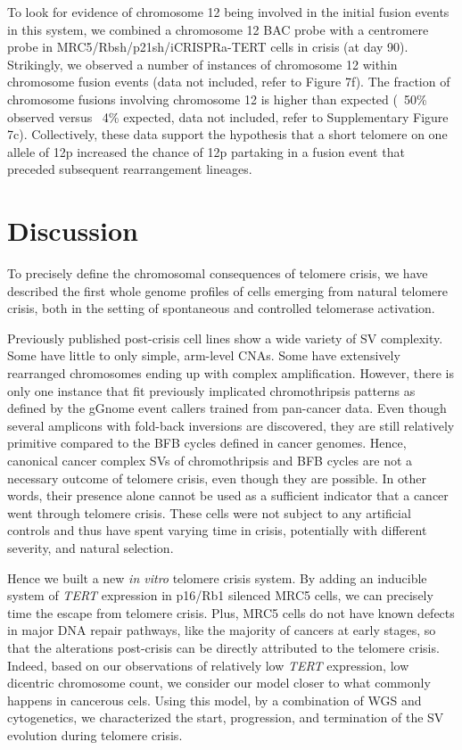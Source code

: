 \documentclass[phd,tocprelim]{cornell}
\begin{document}
To look for evidence of chromosome 12 being involved in the initial fusion events in this system, we combined a chromosome 12 BAC probe with a centromere probe in MRC5/Rbsh/p21sh/iCRISPRa-TERT cells in crisis (at day 90). Strikingly, we observed a number of instances of chromosome 12 within chromosome fusion events (data not included, refer to \cite{Dewhurst2021-jk} Figure 7f). The fraction of chromosome fusions involving chromosome 12 is higher than expected (~50\% observed versus ~4\% expected, data not included, refer to \cite{Dewhurst2021-jk} Supplementary Figure 7c). Collectively, these data support the hypothesis that a short telomere on one allele of 12p increased the chance of 12p partaking in a fusion event that preceded subsequent rearrangement lineages.

\section{Discussion}
To precisely define the chromosomal consequences of telomere crisis, we have described the first whole genome profiles of cells emerging from natural telomere crisis, both in the setting of spontaneous and controlled telomerase activation. 

Previously published post-crisis cell lines show a wide variety of SV complexity. Some have little to only simple, arm-level CNAs. Some have extensively rearranged chromosomes ending up with complex amplification. However, there is only one instance that fit previously implicated chromothripsis patterns as defined by the gGnome event callers trained from pan-cancer data. Even though several amplicons with fold-back inversions are discovered, they are still relatively primitive compared to the BFB cycles defined in cancer genomes. Hence, canonical cancer complex SVs of chromothripsis and BFB cycles are not a necessary outcome of telomere crisis, even though they are possible. In other words, their presence alone cannot be used as a sufficient indicator that a cancer went through telomere crisis. These cells were not subject to any artificial controls and thus have spent varying time in crisis, potentially with different severity, and natural selection.

Hence we built a new \textit{in vitro} telomere crisis system. By adding an inducible system of \textit{TERT} expression in p16/Rb1 silenced MRC5 cells, we can precisely time the escape from telomere crisis. Plus, MRC5 cells do not have known defects in major DNA repair pathways, like the majority of cancers at early stages, so that the alterations post-crisis can be directly attributed to the telomere crisis. Indeed, based on our observations of relatively low \textit{TERT} expression, low dicentric chromosome count, we consider our model closer to what commonly happens in cancerous cels. Using this model, by a combination of WGS and cytogenetics, we characterized the start, progression, and termination of the SV evolution during telomere crisis. 
\end{document}
